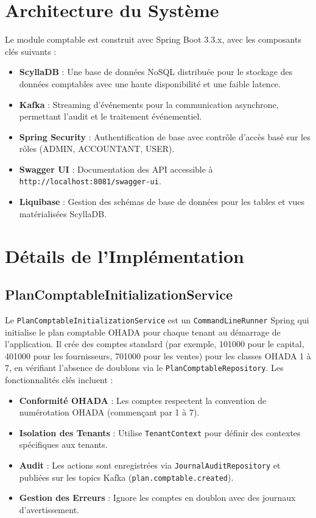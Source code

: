 \documentclass[a4paper,12pt]{article}
\begin{document}
\section{Architecture du Système}
Le module comptable est construit avec Spring Boot 3.3.x, avec les composants clés suivants :
\begin{itemize}
    \item \textbf{ScyllaDB} : Une base de données NoSQL distribuée pour le stockage des données comptables avec une haute disponibilité et une faible latence.
    \item \textbf{Kafka} : Streaming d'événements pour la communication asynchrone, permettant l'audit et le traitement événementiel.
    \item \textbf{Spring Security} : Authentification de base avec contrôle d'accès basé sur les rôles (ADMIN, ACCOUNTANT, USER).
    \item \textbf{Swagger UI} : Documentation des API accessible à \texttt{http://localhost:8081/swagger-ui}.
    \item \textbf{Liquibase} : Gestion des schémas de base de données pour les tables et vues matérialisées ScyllaDB.
\end{itemize}

\section{Détails de l'Implémentation}

\subsection{PlanComptableInitializationService}
Le \texttt{PlanComptableInitializationService} est un \texttt{CommandLineRunner} Spring qui initialise le plan comptable OHADA pour chaque tenant au démarrage de l'application. Il crée des comptes standard (par exemple, 101000 pour le capital, 401000 pour les fournisseurs, 701000 pour les ventes) pour les classes OHADA 1 à 7, en vérifiant l'absence de doublons via le \texttt{PlanComptableRepository}. Les fonctionnalités clés incluent :
\begin{itemize}
    \item \textbf{Conformité OHADA} : Les comptes respectent la convention de numérotation OHADA (commençant par 1 à 7).
    \item \textbf{Isolation des Tenants} : Utilise \texttt{TenantContext} pour définir des contextes spécifiques aux tenants.
    \item \textbf{Audit} : Les actions sont enregistrées via \texttt{JournalAuditRepository} et publiées sur les topics Kafka (\texttt{plan.comptable.created}).
    \item \textbf{Gestion des Erreurs} : Ignore les comptes en doublon avec des journaux d'avertissement.
\end{itemize}
\end{document}
